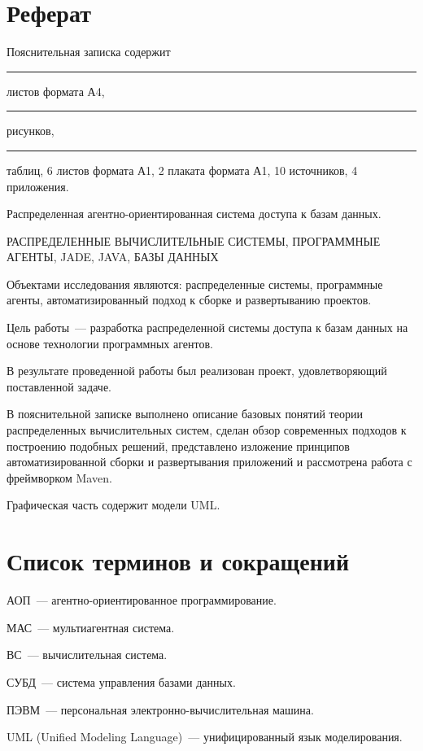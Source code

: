 \updateStamp
{}
\section*{Реферат}
Пояснительная записка содержит \rule{10mm}{0.4pt} листов формата А4, \rule{7mm}{0.4pt} рисунков, \rule{7mm}{0.4pt} таблиц, 6 листов формата А1, 2 плаката формата А1, 10 источников, 4 приложения.

Распределенная агентно-ориентированная система доступа к базам данных.

РАСПРЕДЕЛЕННЫЕ ВЫЧИСЛИТЕЛЬНЫЕ СИСТЕМЫ, ПРОГРАММНЫЕ АГЕНТЫ, JADE, JAVA, БАЗЫ ДАННЫХ

Объектами исследования являются: распределенные системы, программные агенты, автоматизированный подход к сборке и развертыванию проектов.

Цель работы~--- разработка распределенной системы доступа к базам данных на основе технологии программных агентов.

В результате проведенной работы был реализован проект, удовлетворяющий поставленной задаче.

В пояснительной записке выполнено описание базовых понятий теории распределенных вычислительных систем, сделан обзор современных подходов к построению подобных решений,  представлено изложение принципов  автоматизированной сборки и развертывания приложений и рассмотрена работа с фреймворком Maven.

Графическая часть содержит модели UML.

\newpage
\section*{Список терминов и сокращений}
АОП~--- агентно-ориентированное программирование.

МАС~--- мультиагентная система.
 
ВС~--- вычислительная система.

СУБД~--- система управления базами данных.

ПЭВМ~--- персональная электронно-вычислительная машина.

UML (Unified Modeling Language)~--- унифицированный язык моделирования.
